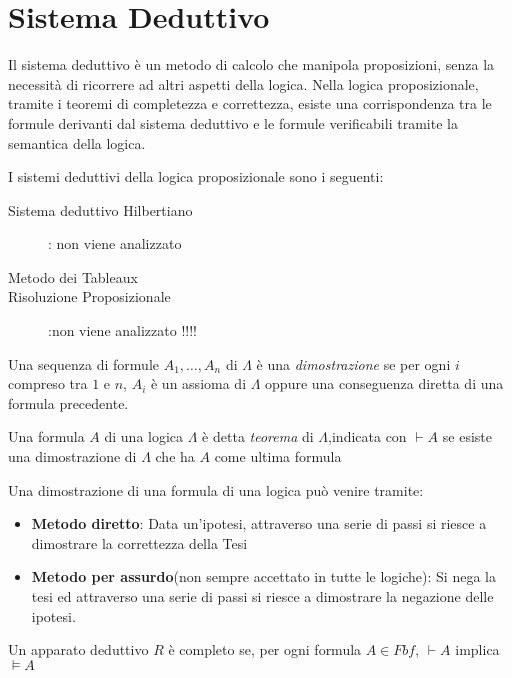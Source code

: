 \section{Sistema Deduttivo}
Il sistema deduttivo è un metodo di calcolo che manipola proposizioni, senza la
necessità di ricorrere ad altri aspetti della logica.\newline
Nella logica proposizionale, tramite i teoremi di completezza e correttezza, esiste
una corrispondenza tra le formule derivanti dal sistema deduttivo e le formule verificabili
tramite la semantica della logica.

I sistemi deduttivi della logica proposizionale sono i seguenti:
\begin{description}
    \item[Sistema deduttivo Hilbertiano]: non viene analizzato
    \item[Metodo dei Tableaux]
    \item [Risoluzione Proposizionale]:non viene analizzato !!!!
\end{description}

\begin{defi}
Una sequenza di formule $A_1,\dots,A_n$ di $\Lambda$ è una \emph{dimostrazione} se
per ogni $i$ compreso tra $1$ e $n$, $A_i$ è un assioma di $\Lambda$ oppure una
conseguenza diretta di una formula precedente.
\end{defi}

\begin{defi}
Una formula $A$ di una logica $\Lambda$ è detta \emph{teorema} di $\Lambda$,indicata
con $\vdash A$ se esiste una dimostrazione di $\Lambda$ che ha $A$ come ultima formula
\end{defi}

Una dimostrazione di una formula di una logica può venire tramite:
\begin{itemize}
  \item  \textbf{Metodo diretto}: Data un'ipotesi, attraverso una serie di passi
          si riesce a dimostrare la correttezza della Tesi
  \item \textbf{Metodo per assurdo}(non sempre accettato in tutte le logiche):
        Si nega la tesi ed attraverso una serie di passi si riesce a dimostrare
        la negazione delle ipotesi.
\end{itemize}

\begin{thm}
    Un apparato deduttivo $R$ è completo se, per ogni formula $A \in Fbf$, $\vdash A$
    implica $\models A$
\end{thm}

